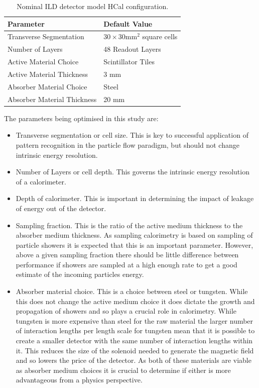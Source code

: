 \begin{table}[h!]
\centering
\begin{tabular}{ l l}
\hline
Parameter & Default Value \\
\hline
Transverse Segmentation & $30 \times 30 \text{mm}^{2}$ square cells \\
Number of Layers & 48 Readout Layers \\
Active Material Choice & Scintillator Tiles  \\
Active Material Thickness & 3 mm  \\
Absorber Material Choice & Steel \\
Absorber Material Thickness & 20 mm \\
\hline
\end{tabular}
\caption[Nominal ILD detector model HCal configuration.]{Nominal ILD detector model HCal configuration.}
\label{table:defaultildhcal}
\end{table}


The parameters being optimised in this study are:
\begin{itemize}
\item Transverse segmentation or cell size.  This is key to successful application of pattern recognition in the particle flow paradigm, but should not change intrinsic energy resolution.   
\item Number of Layers or cell depth.  This governs the intrinsic energy resolution of a calorimeter.
\item Depth of calorimeter.  This is important in determining the impact of leakage of energy out of the detector.  
\item Sampling fraction.  This is the ratio of the active medium thickness to the absorber medium thickness.  As sampling calorimetry is based on sampling of particle showers it is expected that this is an important parameter.  However, above a given sampling fraction there should be little difference between performance if showers are sampled at a high enough rate to get a good estimate of the incoming particles energy.
\item Absorber material choice.  This is a choice between steel or tungsten.  While this does not change the active medium choice it does dictate the growth and propagation of showers and so plays a crucial role in calorimetry.  While tungsten is more expensive than steel for the raw material the larger number of interaction lengths per length scale for tungsten mean that it is possible to create a smaller detector with the same number of interaction lengths within it.  This reduces the size of the solenoid needed to generate the magnetic field and so lowers the price of the detector.  As both of these materials are viable as absorber medium choices it is crucial to determine if either is more advantageous from a physics perspective.  
\end{itemize}

